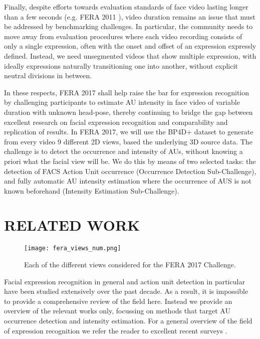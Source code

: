 \documentclass[a4paper, 10pt, conference]{ieeeconf}      \usepackage{FG2017}
\begin{document}
Finally, despite efforts towards evaluation standards of face video lasting longer than a few seconds (e.g. FERA 2011 \cite{ValstarEtAl2011_FFE}), video duration remains an issue that must be addressed by benchmarking challenges. In particular, the community needs to move away from evaluation procedures where each video recording consists of only a single expression, often with the onset and offset of an expression expressly defined. Instead, we need unsegmented videos that show multiple expression, with ideally expressions naturally transitioning one into another, without explicit neutral divisions in between.

In these respects, FERA 2017 shall help raise the bar for expression recognition by challenging participants to estimate AU intensity in face video of variable duration with unknown head-pose, thereby continuing to bridge the gap between excellent research on facial expression recognition and comparability and replication of results. In FERA 2017, we will use the BP4D+ dataset \cite{ZhangEtAl2016_MSE} to generate from every video 9 different 2D views, based the underlying 3D source data. The challenge is to detect the occurrence  and intensity of AUs, without knowing a priori what the facial view will be. We do this by means of two selected tasks: the detection of FACS Action Unit occurrence (Occurrence Detection Sub-Challenge), and fully automatic AU intensity estimation where the occurrence of AUS is not known beforehand (Intensity Estimation Sub-Challenge).
 
 \section{RELATED WORK \label{s:relatedwork}}

\begin{figure*}[t!]
  \centering \texttt{[image: fera\_views\_num.png]}
  \caption{Each of the different views considered for the FERA 2017 Challenge.}
\label{f:views}
\end{figure*}

\noindent Facial expression recognition in general and action unit detection in particular have been studied extensively over the past decade. As a result, it is impossible to provide a comprehensive review of the field here. Instead we provide an overview of the relevant works only, focussing on methods that target AU occurrence detection and intensity estimation. For a general overview of the field of expression recognition we refer the reader to excellent recent surveys \cite{Corneanu2016, ZengEtAl09}.
\end{document}
